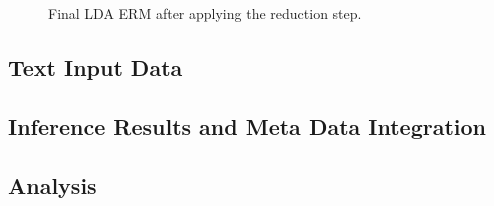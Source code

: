 \begin{figure}[p]
\centering
\scalebox{0.5}{\adjustTikzSize }
\caption[Final LDA ERM after applying the reduction step]{Final LDA ERM after applying the reduction step.}\label{fig:topic_erm_good_reduced}
\end{figure}



\subsection{Text Input Data}

\subsection{Inference Results and Meta Data Integration}

\subsection{Analysis}
